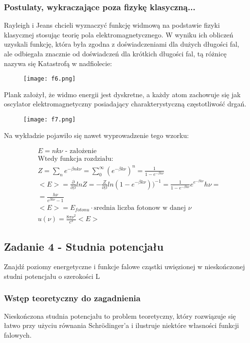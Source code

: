 \documentclass[a4paper,15pt]{article}
\newcommand{\issue}[2]{
    \begin{tcolorbox}[colback=issueColor!5!white,colframe=issueColor,title={Zagadnienie #1}]
        #2
    \end{tcolorbox}
}
\begin{document}
\subsubsection{Postulaty, wykraczające poza fizykę klasyczną...}
Rayleigh i Jeans chcieli wyznaczyć funkcję widmową na podstawie fizyki klasycznej stosując teorię pola elektromagnetycznego. W wyniku ich obliczeń uzyskali funkcję, która była zgodna z doświadczeniami dla dużych długości fal, ale odbiegała znacznie od doświadczeń dla krótkich długości fal, tą różnicę nazywa się Katastrofą w nadfiolecie: 
 \begin{figure}[H]
\centerline{\texttt{[image: f6.png]}}
\end{figure}
Plank założył, że widmo energii jest dyskretne, a każdy atom zachowuje się jak oscylator elektromagnetyczny posiadający charakterystyczną częstotliwość drgań.
 \begin{figure}[H]
\centerline{\texttt{[image: f7.png]}}
\end{figure}

Na wykładzie pojawiło się nawet wyprowadzenie tego wzorku:

\begin{align*}
& E = nk\nu \text{ - założenie} \\
& \text{Wtedy funkcja rozdziału: } \\
& Z = \sum_{n} e^{-\beta nk\nu} = \sum_{0}^{\infty}(e^{-\beta k\nu})^n = \frac{1}{1-e^{-\beta k\nu}} \\
& <E> = \frac{\partial}{\partial \beta}ln Z = -\frac{Z}{\partial \beta}ln(1-e^{-\beta k\nu }))^{-1} = \frac{1}{1-e^{-\beta k\nu }}e^{e^{-\beta k\nu}} h\nu = \\
& = \frac{h\nu}{e^{\beta k\nu}-1} \\
& <E> = E_{fotonu} \cdot \text{srednia liczba fotonow w danej } \nu \\
& u(\nu) = \frac{8\pi \nu^2 }{c^3}<E>
\end{align*}



\newpage
\subsection{Zadanie 4 - Studnia potencjału}

\issue{}{
Znajdź poziomy energetyczne i funkcje falowe cząstki uwięzionej w nieskończonej studni potencjału o szerokości L
}

\subsubsection{Wstęp teoretyczny do zagadnienia}
Nieskończona studnia potencjału to problem teoretyczny, który rozwiązuje się łatwo przy użyciu równania Schrödinger'a i ilustruje niektóre własności funkcji falowych. \\
\end{document}
